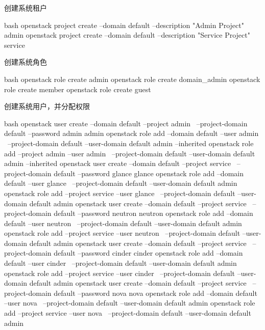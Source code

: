 创建系统租户

\begin{code-block}{bash}
openstack project create --domain default --description "Admin Project" admin 
openstack project create --domain default --description "Service Project" service
\end{code-block}

创建系统角色

\begin{code-block}{bash}
openstack role create admin
openstack role create domain_admin
openstack role create member
openstack role create guest
\end{code-block}

创建系统用户，并分配权限

\begin{long-block}{bash}
openstack user create --domain default --project admin \
    --project-domain default --password admin admin
openstack role add --domain default --user admin \
    --project-domain default --user-domain default admin  --inherited
openstack role add --project admin --user admin \
    --project-domain default --user-domain default admin  --inherited
openstack user create --domain default --project service \
    --project-domain default --password glance glance
openstack role add --domain default --user glance \
    --project-domain default --user-domain default admin
openstack role add --project service --user glance \
    --project-domain default --user-domain default admin
openstack user create --domain default --project service \
    --project-domain default --password neutron neutron
openstack role add --domain default --user neutron \
    --project-domain default --user-domain default admin
openstack role add --project service --user neutron \
    --project-domain default --user-domain default admin
openstack user create --domain default --project service \
    --project-domain default --password cinder  cinder
openstack role add --domain default --user cinder \
    --project-domain default --user-domain default admin
openstack role add --project service --user cinder \
    --project-domain default --user-domain default admin
openstack user create --domain default --project service \
    --project-domain default --password nova nova
openstack role add --domain default --user nova \
    --project-domain default --user-domain default admin
openstack role add --project service --user nova \
    --project-domain default --user-domain default admin
\end{long-block}

